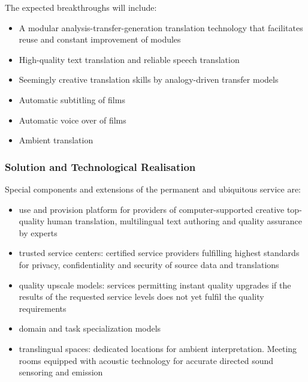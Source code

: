 \documentclass[10pt, plain]{../../metanetpaper}
\begin{document}
\begin{multicols}{2}
The expected breakthroughs will include:

\begin{itemize}
\item A modular analysis-transfer-generation translation technology that facilitates reuse and constant improvement of modules
\item High-quality text translation and reliable speech translation
\item Seemingly creative translation skills by analogy-driven transfer models
\item Automatic subtitling of films
\item Automatic voice over of films
\item Ambient translation
\end{itemize}

\subsubsection{Solution and Technological Realisation}
\label{sec:solut-techn-real-pt1}


Special components and extensions of the permanent and ubiquitous service are:

\begin{itemize}
\item use and provision platform for providers of computer-supported creative top-quality human translation, multilingual text authoring and quality assurance by experts
\item trusted service centers: certified service providers fulfilling highest standards for privacy, confidentiality and security of source data and translations
\item quality upscale models: services permitting instant quality upgrades if the results of the requested service levels does not yet fulfil the quality requirements
\item domain and task specialization models
\item translingual spaces: dedicated locations for ambient interpretation. Meeting rooms equipped with acoustic technology for accurate directed sound sensoring and emission
\end{itemize}
 

\end{multicols}
\end{document}
